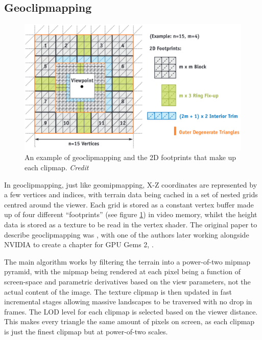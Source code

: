 \documentclass[notitlepage,12pt]{article}
\begin{document}
\subsection{Geoclipmapping} \label{geoclipmap}

\begin{figure}[ht]
  \centering
  \includegraphics[width=1.0\textwidth]{geoclipmapping_footprints.png}
  \caption{An example of geoclipmapping and the 2D footprints that make up each clipmap. \textit{Credit \cite{geoclipmappingGPUGems}}}
  \label{fig:geoclipmapping}
\end{figure}

In geoclipmapping, just like geomipmapping, X-Z coordinates are represented by a few vertices and indices, with terrain data being cached in a set of nested grids centred around the viewer. Each grid is stored as a constant vertex buffer made up of four different ``footprints'' (see figure \ref{fig:geoclipmapping}) in video memory, whilst the height data is stored as a texture to be read in the vertex shader. The original paper to describe geoclipmapping was \cite{geoclipmapping}, with one of the authors later working alongside NVIDIA to create a chapter for GPU Gems 2, \cite{geoclipmappingGPUGems}.

The main algorithm works by filtering the terrain into a power-of-two mipmap pyramid, with the mipmap being rendered at each pixel being a function of screen-space and parametric derivatives based on the view parameters, not the actual content of the image. The texture clipmap is then updated in fast incremental stages allowing massive landscapes to be traversed with no drop in frames. The LOD level for each clipmap is selected based on the viewer distance. This makes every triangle the same amount of pixels on screen, as each clipmap is just the finest clipmap but at power-of-two scales.
\end{document}
